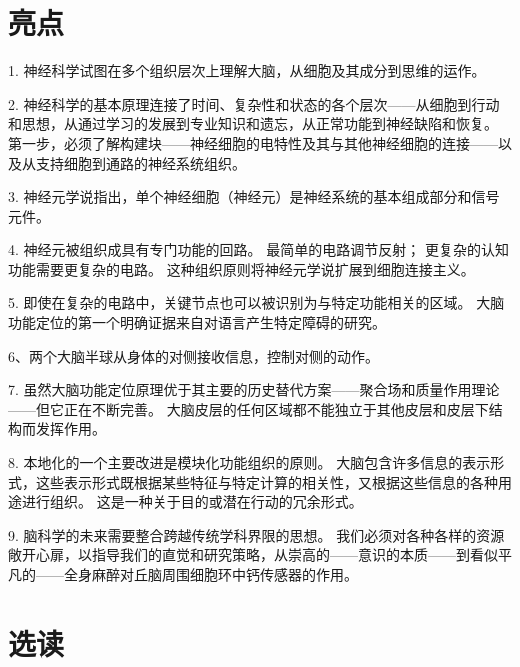 \section{亮点}

1. 神经科学试图在多个组织层次上理解大脑，从细胞及其成分到思维的运作。

2. 神经科学的基本原理连接了时间、复杂性和状态的各个层次——从细胞到行动和思想，从通过学习的发展到专业知识和遗忘，从正常功能到神经缺陷和恢复。 第一步，必须了解构建块——神经细胞的电特性及其与其他神经细胞的连接——以及从支持细胞到通路的神经系统组织。

3. 神经元学说指出，单个神经细胞（神经元）是神经系统的基本组成部分和信号元件。

4. 神经元被组织成具有专门功能的回路。 最简单的电路调节反射； 更复杂的认知功能需要更复杂的电路。 这种组织原则将神经元学说扩展到细胞连接主义。

5. 即使在复杂的电路中，关键节点也可以被识别为与特定功能相关的区域。 大脑功能定位的第一个明确证据来自对语言产生特定障碍的研究。

6、两个大脑半球从身体的对侧接收信息，控制对侧的动作。

7. 虽然大脑功能定位原理优于其主要的历史替代方案——聚合场和质量作用理论——但它正在不断完善。 大脑皮层的任何区域都不能独立于其他皮层和皮层下结构而发挥作用。

8. 本地化的一个主要改进是模块化功能组织的原则。 大脑包含许多信息的表示形式，这些表示形式既根据某些特征与特定计算的相关性，又根据这些信息的各种用途进行组织。 这是一种关于目的或潜在行动的冗余形式。

9. 脑科学的未来需要整合跨越传统学科界限的思想。 我们必须对各种各样的资源敞开心扉，以指导我们的直觉和研究策略，从崇高的——意识的本质——到看似平凡的——全身麻醉对丘脑周围细胞环中钙传感器的作用。


\section{选读}

